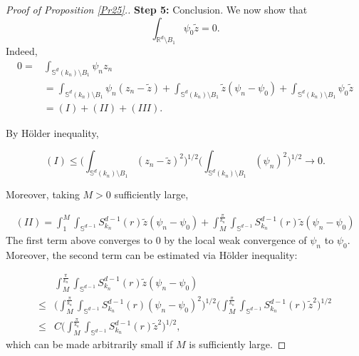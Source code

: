 \documentclass[reqno]{amsart}
\numberwithin{equation}{section}
\newenvironment{key words}{\textbf{Keywords}\mbox{  }}{ }
\begin{document}
\begin{proof}[Proof of Proposition \ref{Pr25}.]
%



\medskip

\textbf{Step 5:} Conclusion.
We now show that
\[\int_{\mathbb{R}^{d}\setminus B_{1}} \psi_{0}\tilde{z}=0.\]
Indeed,
\begin{align*}
0=&\int_{\mathbb{S}^{d}(k_{n})\setminus B_{1}}  \psi_{n}z_{n}\\
&=\int_{\mathbb{S}^{d}(k_{n})\setminus B_{1}}  \psi_{n}(z_{n} -\tilde{z} ) +\int_{\mathbb{S}^{d}(k_{n})\setminus B_{1}}\tilde{z}(\psi_n- \psi_{0}) +\int_{\mathbb{S}^{d}(k_{n})\setminus B_{1}}   \psi_{0}\tilde{z} \\
& = (I) + (II) + (III).
\end{align*}

By H\"{o}lder inequality,

$$ (I) \leq \Big ( \int_{\mathbb{S}^{d}(k_{n})\setminus B_{1}} (z_n - \tilde{z})^2 \Big )^{1/2} \Big ( \int_{\mathbb{S}^{d}(k_{n})\setminus B_{1}} (\psi_n)^2 \Big )^{1/2} \to 0.$$

Moreover, taking $M>0$ sufficiently large,

\begin{align*} (II)= \int_{1}^{M} \int_{\mathbb{S}^{d-1}} S^{d-1}_{k_n}(r) \tilde{z} (\psi_{n}- \psi_0) + \int_{M}^{\frac{\pi}{k_n}} \int_{\mathbb{S}^{d-1}} S^{d-1}_{k_n}(r)  \tilde{z} (\psi_{n}- \psi_0)\end{align*}
The first term above converges to $0$ by the local weak convergence of $\psi_n$ to $\psi_0$. Moreover, the second term can be estimated via H\"{o}lder inequality:

\begin{align*} &\int_{M}^{\frac{\pi}{k_n}} \int_{\mathbb{S}^{d-1}} S^{d-1}_{k_n}(r)  \tilde{z} (\psi_{n}- \psi_0) \\ \le & \Big (\int_{M}^{\frac{\pi}{k_n}} \int_{\mathbb{S}^{d-1}} S^{d-1}_{k_n}(r)  (\psi_{n}- \psi_0)^2 \Big )^{1/2} \Big ( \int_{M}^{\frac{\pi}{k_n}} \int_{\mathbb{S}^{d-1}} S^{d-1}_{k_n}(r)  \tilde{z}^2 \Big )^{1/2}  \\  \le  & C \Big ( \int_{M}^{\frac{\pi}{k_n}} \int_{\mathbb{S}^{d-1}} S^{d-1}_{k_n}(r)  \tilde{z}^2 \Big )^{1/2},\end{align*}
which can be made arbitrarily small if $M$ is sufficiently large.



\end{proof}
\end{document}
